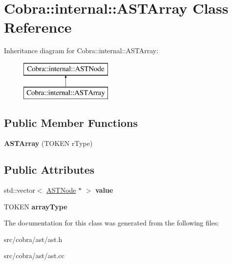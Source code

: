 \hypertarget{class_cobra_1_1internal_1_1_a_s_t_array}{\section{Cobra\+:\+:internal\+:\+:A\+S\+T\+Array Class Reference}
\label{class_cobra_1_1internal_1_1_a_s_t_array}
}
Inheritance diagram for Cobra\+:\+:internal\+:\+:A\+S\+T\+Array\+:\begin{figure}[H]
\begin{center}
\leavevmode
\includegraphics[height=2.000000cm]{class_cobra_1_1internal_1_1_a_s_t_array}
\end{center}
\end{figure}
\subsection*{Public Member Functions}
\begin{DoxyCompactItemize}
\item 
\hypertarget{class_cobra_1_1internal_1_1_a_s_t_array_a7e73df9cce52c269cd22e60bc6483fdf}{{\bfseries A\+S\+T\+Array} (T\+O\+K\+E\+N r\+Type)}\label{class_cobra_1_1internal_1_1_a_s_t_array_a7e73df9cce52c269cd22e60bc6483fdf}

\end{DoxyCompactItemize}
\subsection*{Public Attributes}
\begin{DoxyCompactItemize}
\item 
\hypertarget{class_cobra_1_1internal_1_1_a_s_t_array_a5e06b381684e0af6cd91e7b638172b90}{std\+::vector$<$ \hyperlink{class_cobra_1_1internal_1_1_a_s_t_node}{A\+S\+T\+Node} $\ast$ $>$ {\bfseries value}}\label{class_cobra_1_1internal_1_1_a_s_t_array_a5e06b381684e0af6cd91e7b638172b90}

\item 
\hypertarget{class_cobra_1_1internal_1_1_a_s_t_array_a13ba0e96bfc8ede1589a2da9c4bbcf8b}{T\+O\+K\+E\+N {\bfseries array\+Type}}\label{class_cobra_1_1internal_1_1_a_s_t_array_a13ba0e96bfc8ede1589a2da9c4bbcf8b}

\end{DoxyCompactItemize}


The documentation for this class was generated from the following files\+:\begin{DoxyCompactItemize}
\item 
src/cobra/ast/ast.\+h\item 
src/cobra/ast/ast.\+cc\end{DoxyCompactItemize}
